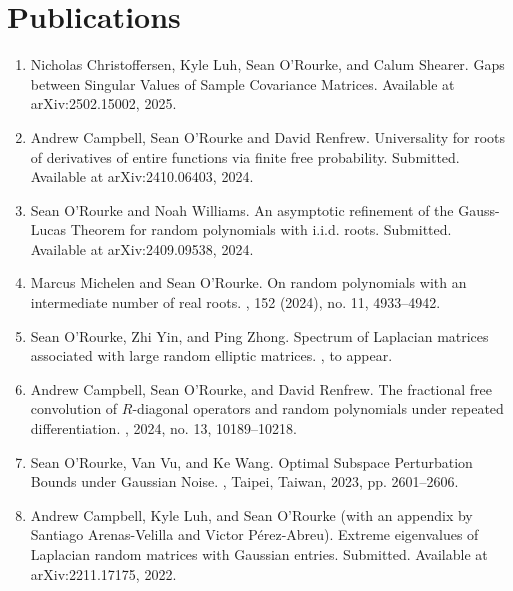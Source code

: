 \documentclass[letterpaper]{article}
\begin{document}
\section*{Publications}
\begin{enumerate}
	\item Nicholas Christoffersen, Kyle Luh, Sean O'Rourke, and Calum Shearer.
	\newblock Gaps between Singular Values of Sample Covariance Matrices.
	\newblock Available at arXiv:2502.15002, 2025. 
	
	\item Andrew Campbell, Sean O'Rourke and David Renfrew. 
	\newblock Universality for roots of derivatives of entire functions via finite free probability. 
	\newblock Submitted.  Available at arXiv:2410.06403, 2024. 

	\item Sean O'Rourke and Noah Williams. 
	\newblock An asymptotic refinement of the Gauss-Lucas Theorem for random polynomials with i.i.d. roots. 
	\newblock Submitted.  Available at arXiv:2409.09538, 2024. 

	\item Marcus Michelen and Sean O'Rourke. 
	\newblock On random polynomials with an intermediate number of real roots. 
	, 152 (2024), no. 11, 4933--4942.
	
	\item Sean O'Rourke, Zhi Yin, and Ping Zhong. 
	\newblock Spectrum of Laplacian matrices associated with large random elliptic matrices.
	, to appear.  

	\item Andrew Campbell, Sean O'Rourke, and David Renfrew. 
	\newblock The fractional free convolution of $R$-diagonal operators and random polynomials under repeated differentiation. 
	,  2024, no. 13, 10189--10218. 
	
	\item Sean O'Rourke, Van Vu, and Ke Wang. 
	\newblock Optimal Subspace Perturbation Bounds under Gaussian Noise. 
	, Taipei, Taiwan, 2023, pp. 2601--2606. 

	\item Andrew Campbell, Kyle Luh, and Sean O'Rourke (with an appendix by Santiago Arenas-Velilla and Victor P\'{e}rez-Abreu). 
	\newblock Extreme eigenvalues of Laplacian random matrices with Gaussian entries.  
	\newblock Submitted.  Available at arXiv:2211.17175, 2022.  


\end{enumerate}
\end{document}
